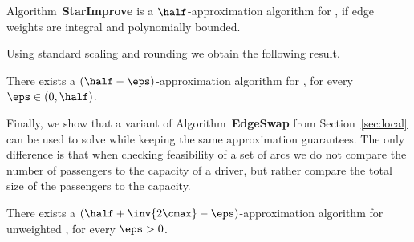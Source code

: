 \begin{theorem}
Algorithm~\textbf{StarImprove} is a $\half$-approximation algorithm
for \gcp, if edge weights are integral and polynomially bounded.
\end{theorem}

Using standard scaling and rounding we obtain the following result.

\begin{theorem}
There exists a $(\half-\eps)$-approximation algorithm for \gcp,
for every $\eps \in (0,\half)$.
\end{theorem}


Finally, we show that a variant of Algorithm~\textbf{EdgeSwap} from
Section~\ref{sec:local} can be used to solve \gcp while keeping the
same approximation guarantees. 
%
The only difference is that when checking feasibility of a set of arcs
we do not compare the number of passengers to the capacity of a
driver, but rather compare the total size of the passengers to the
capacity.

\begin{theorem}
There exists a $(\half + \inv{2\cmax} - \eps)$-approximation algorithm
for unweighted \gcp, for every $\eps>0$.
\end{theorem}